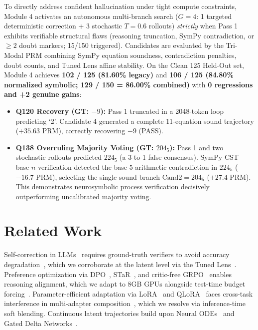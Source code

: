 \documentclass[11pt,a4paper]{article}
\begin{document}
To directly address confident hallucination under tight compute constraints, Module 4 activates an autonomous multi-branch search ($G=4$: 1 targeted deterministic correction + 3 stochastic $T=0.6$ rollouts) \textit{strictly} when Pass 1 exhibits verifiable structural flaws (reasoning truncation, SymPy contradiction, or $\ge 2$ doubt markers; 15/150 triggered). Candidates are evaluated by the Tri-Modal PRM combining SymPy equation soundness, contradiction penalties, doubt counts, and Tuned Lens affine stability. On the Clean 125 Held-Out set, Module 4 achieves \textbf{102 / 125 (81.60\% legacy)} and \textbf{106 / 125 (84.80\% normalized symbolic; 129 / 150 = 86.00\% combined)} with \textbf{0 regressions and +2 genuine gains}:
\begin{itemize}
    \item \textbf{Q120 Recovery (GT: $-9$):} Pass 1 truncated in a 2048-token loop predicting `2'. Candidate 4 generated a complete 11-equation sound trajectory ($+35.63$ PRM), correctly recovering $\boxed{-9}$ (PASS).
    \item \textbf{Q138 Overruling Majority Voting (GT: $204_5$):} Pass 1 and two stochastic rollouts predicted $224_5$ (a 3-to-1 false consensus). SymPy CST base-$n$ verification detected the base-5 arithmetic contradiction in $224_5$ ($-16.7$ PRM), selecting the single sound branch $\text{Cand2} = 204_5$ ($+27.4$ PRM). This demonstrates neurosymbolic process verification decisively outperforming uncalibrated majority voting.
\end{itemize}

\section{Related Work}

Self-correction in LLMs~\cite{madaan2023selfrefine,shinn2023reflexion} requires ground-truth verifiers to avoid accuracy degradation~\cite{huang2023cannot}, which we corroborate at the latent level via the Tuned Lens~\cite{belrose2023tunedlens}. Preference optimization via DPO~\cite{rafailov2023dpo}, STaR~\cite{zelikman2022star}, and critic-free GRPO~\cite{shao2024deepseekmath} enables reasoning alignment, which we adapt to 8GB GPUs alongside test-time budget forcing~\cite{muennighoff2025s1}. Parameter-efficient adaptation via LoRA~\cite{hu2021lora} and QLoRA~\cite{dettmers2023qlora} faces cross-task interference in multi-adapter composition~\cite{huang2023lorahub}, which we resolve via inference-time soft blending. Continuous latent trajectories build upon Neural ODEs~\cite{chen2018neuralode} and Gated Delta Networks~\cite{yang2024gateddelta}.
\end{document}
